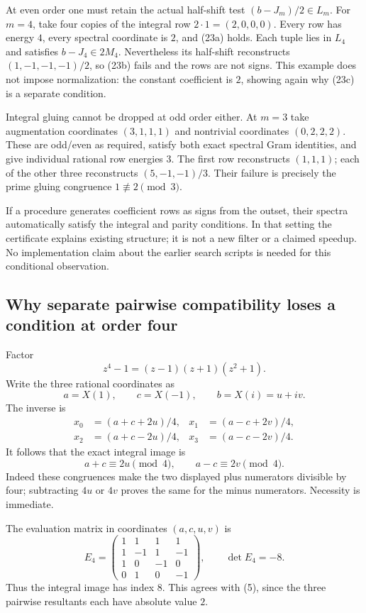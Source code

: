 \documentclass[
  11pt,
]{article}
\begin{document}
At even order one must retain the actual half-shift test
\((b-J_m)/2\in L_m\). For \(m=4\), take four copies of the integral row
\(2\cdot1=(2,0,0,0)\). Every row has energy \(4\), every spectral
coordinate is \(2\), and (23a) holds. Each tuple lies in \(L_4\) and
satisfies \(b-J_4\in2M_4\). Nevertheless its half-shift reconstructs
\((1,-1,-1,-1)/2\), so (23b) fails and the rows are not signs. This
example does not impose normalization: the constant coefficient is
\(2\), showing again why (23c) is a separate condition.

Integral gluing cannot be dropped at odd order either. At \(m=3\) take
augmentation coordinates \((3,1,1,1)\) and nontrivial coordinates
\((0,2,2,2)\). These are odd/even as required, satisfy both exact
spectral Gram identities, and give individual rational row energies
\(3\). The first row reconstructs \((1,1,1)\); each of the other three
reconstructs \((5,-1,-1)/3\). Their failure is precisely the prime
gluing congruence \(1\not\equiv2\pmod3\).

If a procedure generates coefficient rows as signs from the outset,
their spectra automatically satisfy the integral and parity conditions.
In that setting the certificate explains existing structure; it is not a
new filter or a claimed speedup. No implementation claim about the
earlier search scripts is needed for this conditional observation.

\subsection{Why separate pairwise compatibility loses a condition at
order
four}\label{why-separate-pairwise-compatibility-loses-a-condition-at-order-four}

Factor \[
 z^4-1=(z-1)(z+1)(z^2+1).
 \] Write the three rational coordinates as \[
 a=X(1),\qquad c=X(-1),\qquad b=X(i)=u+iv.
 \] The inverse is \[
 \begin{aligned}
 x_0&=(a+c+2u)/4,&x_1&=(a-c+2v)/4,\\
 x_2&=(a+c-2u)/4,&x_3&=(a-c-2v)/4.
 \end{aligned}                                           \tag{24}
\] It follows that the exact integral image is \[
 \boxed{a+c\equiv2u\pmod4,\qquad
        a-c\equiv2v\pmod4.}                              \tag{25}
\] Indeed these congruences make the two displayed plus numerators
divisible by four; subtracting \(4u\) or \(4v\) proves the same for the
minus numerators. Necessity is immediate.

The evaluation matrix in coordinates \((a,c,u,v)\) is \[
 E_4=\begin{pmatrix}
 1&1&1&1\\1&-1&1&-1\\1&0&-1&0\\0&1&0&-1
 \end{pmatrix},\qquad \det E_4=-8.
 \] Thus the integral image has index \(8\). This agrees with (5), since
the three pairwise resultants each have absolute value \(2\).
\end{document}
